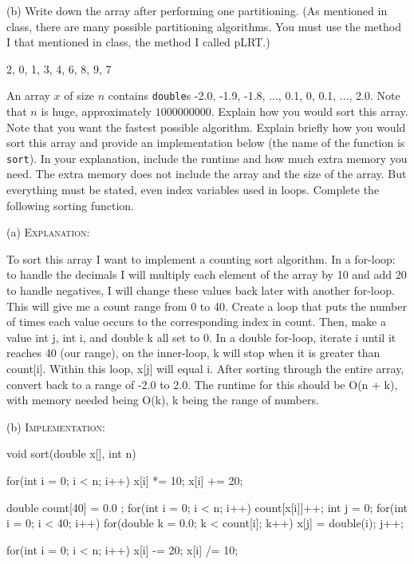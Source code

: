 (b)
Write down the array after performing one partitioning.
(As mentioned in class, there are many possible partitioning
algorithms. You must use the method I that mentioned in class,
the method I called pLRT.)
\\
\ANSWER
\begin{answercode}
{2, 0, 1, 3, 4, 6, 8, 9, 7}
\end{answercode}

\newpage
\nextq
An array $x$ of size $n$ contains \verb!double!s
-2.0, -1.9, -1.8, ..., 0.1, 0, 0.1, ..., 2.0.
Note that $n$ is huge, approximately $1000000000$.
Explain how you would sort this array.
Note that you want the fastest possible algorithm.
Explain briefly how you would sort this array and provide an implementation below
(the name of the function is \verb!sort!).
In your explanation, include the runtime and how much extra memory you need.
The extra memory does not include the array and the size of the array.
But everything must be stated, even index variables used in loops. 
Complete the following sorting function.

\ANSWER

(a) \textsc{Explanation:}\vspace{-3mm}
\begin{answerlong}
To sort this array I want to implement a counting sort algorithm. In a for-loop: to handle the decimals I will multiply each element of the array by 10 and add 20 to handle negatives, I will change these values back later with another for-loop. This will give me a count range from 0 to 40. Create a loop that puts the number of times each value occurs to the corresponding index in count. Then, make a value int j, int i, and double k all set to 0. In a double for-loop, iterate i until it reaches 40 (our range), on the inner-loop, k will stop when it is greater than count[i]. Within this loop, x[j] will equal i. After sorting through the entire array, convert back to a range of -2.0 to 2.0. The runtime for this should be O(n + k), with memory needed being O(k), k being the range of numbers.
\end{answerlong}

(b) \textsc{Implementation:}\vspace{-2mm}
\begin{answercode}
void sort(double x[], int n)
{
  for(int i = 0; i < n; i++)
  {
    x[i] *= 10;
    x[i] += 20;
  }
  
  double count[40] = { 0.0 };
  for(int i = 0; i < n; i++)
  {
    count[x[i]]++;
  }
  int j = 0;
  for(int i = 0; i < 40; i++)
  {
    for(double k = 0.0; k < count[i]; k++)
    {
      x[j] = double(i);
      j++;
    }
  }

   for(int i = 0; i < n; i++)
  {
    x[i] -= 20;
    x[i] /= 10;
  }
}  
\end{answercode}

